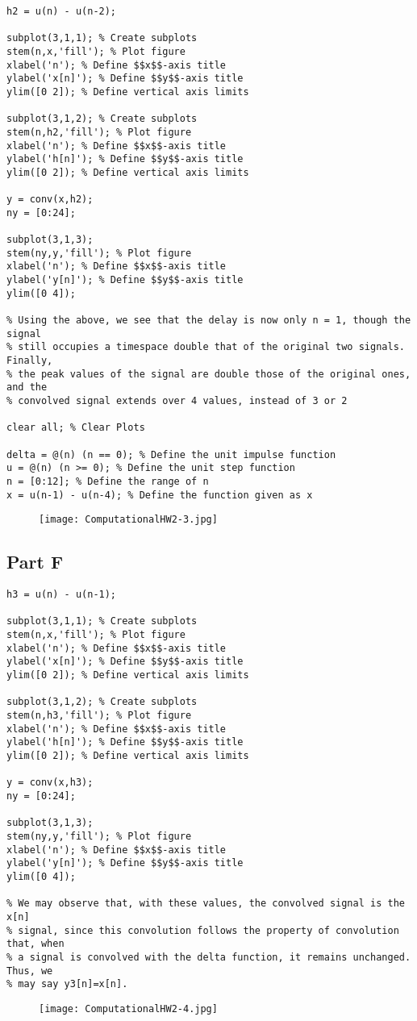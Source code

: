 \documentclass[10pt]{article}
\begin{document}
\begin{lstlisting}
h2 = u(n) - u(n-2);

subplot(3,1,1); % Create subplots
stem(n,x,'fill'); % Plot figure
xlabel('n'); % Define $$x$$-axis title
ylabel('x[n]'); % Define $$y$$-axis title
ylim([0 2]); % Define vertical axis limits

subplot(3,1,2); % Create subplots
stem(n,h2,'fill'); % Plot figure
xlabel('n'); % Define $$x$$-axis title
ylabel('h[n]'); % Define $$y$$-axis title
ylim([0 2]); % Define vertical axis limits

y = conv(x,h2);
ny = [0:24];

subplot(3,1,3);
stem(ny,y,'fill'); % Plot figure
xlabel('n'); % Define $$x$$-axis title
ylabel('y[n]'); % Define $$y$$-axis title
ylim([0 4]);

% Using the above, we see that the delay is now only n = 1, though the signal
% still occupies a timespace double that of the original two signals. Finally,
% the peak values of the signal are double those of the original ones, and the
% convolved signal extends over 4 values, instead of 3 or 2

clear all; % Clear Plots

delta = @(n) (n == 0); % Define the unit impulse function
u = @(n) (n >= 0); % Define the unit step function
n = [0:12]; % Define the range of n
x = u(n-1) - u(n-4); % Define the function given as x
\end{lstlisting}
\begin{figure}[!ht]
\texttt{[image: ComputationalHW2-3.jpg]}
\end{figure}


{}
\subsection*{Part F}

\begin{lstlisting}
h3 = u(n) - u(n-1);

subplot(3,1,1); % Create subplots
stem(n,x,'fill'); % Plot figure
xlabel('n'); % Define $$x$$-axis title
ylabel('x[n]'); % Define $$y$$-axis title
ylim([0 2]); % Define vertical axis limits

subplot(3,1,2); % Create subplots
stem(n,h3,'fill'); % Plot figure
xlabel('n'); % Define $$x$$-axis title
ylabel('h[n]'); % Define $$y$$-axis title
ylim([0 2]); % Define vertical axis limits

y = conv(x,h3);
ny = [0:24];

subplot(3,1,3);
stem(ny,y,'fill'); % Plot figure
xlabel('n'); % Define $$x$$-axis title
ylabel('y[n]'); % Define $$y$$-axis title
ylim([0 4]);

% We may observe that, with these values, the convolved signal is the x[n]
% signal, since this convolution follows the property of convolution that, when
% a signal is convolved with the delta function, it remains unchanged. Thus, we
% may say y3[n]=x[n].
\end{lstlisting}
\begin{figure}[!ht]
\texttt{[image: ComputationalHW2-4.jpg]}
\end{figure}
\end{document}

